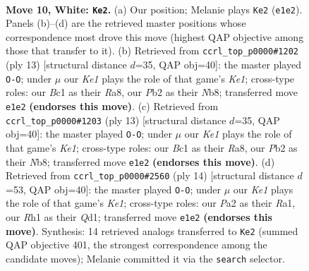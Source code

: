 \documentclass[11pt]{article}
\begin{document}
\begin{figure}[p]\centering
\begin{subfigure}{0.46\textwidth}\centering
\resizebox{\linewidth}{!}{%
\newchessgame
\chessboard[
  setfen={r1bqk2r/ppp2ppp/2n1p3/8/1bPPB3/5N2/PP3PPP/R1BQK2R w KQkq - 1 10},
  showmover=false,
  pgfstyle=straightmove, color=movearrow, markmove={e1-e2}
]}
\caption{}
\end{subfigure}\hfill
\begin{subfigure}{0.46\textwidth}\centering
\resizebox{\linewidth}{!}{%
\newchessgame
\chessboard[
  setfen={rnbqk2r/pp3ppp/5n2/2Pp4/1b6/2N1PN2/PP3PPP/R1BQKB1R b KQkq - 0 7},
  showmover=false,
  pgfstyle=straightmove, color=movearrow, markmove={e8-g8}
]}
\caption{}
\end{subfigure}
\\[4pt]
\begin{subfigure}{0.46\textwidth}\centering
\resizebox{\linewidth}{!}{%
\newchessgame
\chessboard[
  setfen={rnbqk2r/pp3ppp/5n2/2Pp4/1b6/2N1PN2/PP3PPP/R1BQKB1R b KQkq - 0 7},
  showmover=false,
  pgfstyle=straightmove, color=movearrow, markmove={e8-g8}
]}
\caption{}
\end{subfigure}\hfill
\begin{subfigure}{0.46\textwidth}\centering
\resizebox{\linewidth}{!}{%
\newchessgame
\chessboard[
  setfen={r1bqkb1r/pp3ppp/4pn2/2p5/3P4/3B1N2/PPP2PPP/R1BQK2R w KQkq - 0 8},
  showmover=false,
  pgfstyle=straightmove, color=movearrow, markmove={e1-g1}
]}
\caption{}
\end{subfigure}
\caption{\textbf{Move 10, White: \texttt{Ke2}.} (a) Our position; Melanie plays \texttt{Ke2} (\texttt{e1e2}). Panels (b)--(d) are the retrieved master positions whose correspondence most drove this move (highest QAP objective among those that transfer to it). (b) Retrieved from \texttt{ccrl\_top\_p0000\#1202} (ply 13) [structural distance $d$=35, QAP obj=40]: the master played \texttt{O-O}; under $\mu$ our \emph{Ke1} plays the role of that game's \emph{Ke1}; cross-type roles: our \emph{B}c1 as their \emph{R}a8, our \emph{P}b2 as their \emph{N}b8; transferred move \texttt{e1e2} \textbf{(endorses this move)}. (c) Retrieved from \texttt{ccrl\_top\_p0000\#1203} (ply 13) [structural distance $d$=35, QAP obj=40]: the master played \texttt{O-O}; under $\mu$ our \emph{Ke1} plays the role of that game's \emph{Ke1}; cross-type roles: our \emph{B}c1 as their \emph{R}a8, our \emph{P}b2 as their \emph{N}b8; transferred move \texttt{e1e2} \textbf{(endorses this move)}. (d) Retrieved from \texttt{ccrl\_top\_p0000\#2560} (ply 14) [structural distance $d$=53, QAP obj=40]: the master played \texttt{O-O}; under $\mu$ our \emph{Ke1} plays the role of that game's \emph{Ke1}; cross-type roles: our \emph{P}a2 as their \emph{R}a1, our \emph{R}h1 as their \emph{Q}d1; transferred move \texttt{e1e2} \textbf{(endorses this move)}. Synthesis: 14 retrieved analogs transferred to \texttt{Ke2} (summed QAP objective 401, the strongest correspondence among the candidate moves); Melanie committed it via the \texttt{search} selector.}
\label{fig:thought-m18}
\end{figure}
\end{document}

